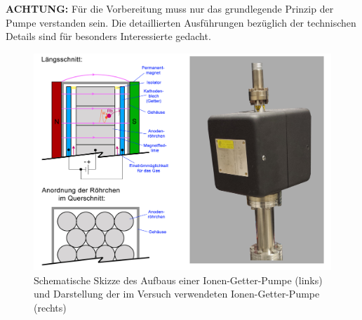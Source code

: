\documentclass[
class=book,
accentcolor=1b,
custommargins=geometry,
fontsize=11pt,
thesis={type=Versuchsanleitung},
ruledheaders=all,
headline=false,
instbox=false,
marginpar=false,
title=small,
ignore-missing-data=true,
twoside=false,
logofile=apqdesign/tuda_logo.pdf,
pdfa=false %
]{apqpub}
\renewcommand{\emph}[1]{\textcolor{TUDa-1b}{\textbf{#1}}}
\begin{document}
			\emph{ACHTUNG:} Für die Vorbereitung muss nur das grundlegende Prinzip der Pumpe verstanden sein. Die detaillierten Ausführungen bezüglich der technischen Details sind für besonders Interessierte gedacht.
			
			\begin{figure}[htb!]
				\centering
				\includegraphics[width=\textwidth]{graphics/IGP.jpg}
				\caption{Schematische Skizze des Aufbaus einer Ionen-Getter-Pumpe (links) und Darstellung der im Versuch verwendeten Ionen-Getter-Pumpe (rechts)}
				\label{fig:IGP}
			\end{figure}
\end{document}
